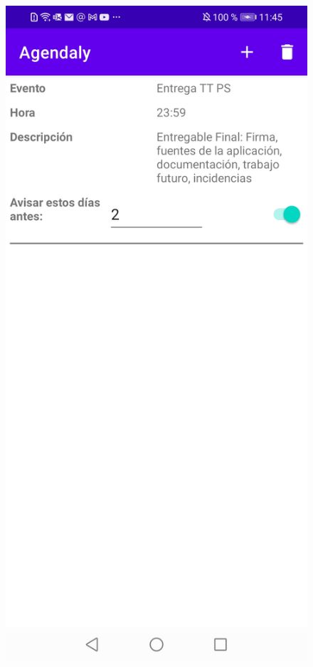\documentclass[a4paper,openright,12pt]{article}
\begin{document}
\begin{figure}
            \includegraphics[scale=0.05]{calendar4.jpg}\hfill

\end{figure}
\end{document}

